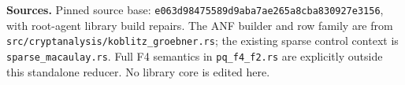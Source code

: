 \documentclass[10pt]{article}
\begin{document}
\textbf{Sources.} Pinned source base:
\texttt{e063d98475589d9aba7ae265a8cba830927e3156}, with root-agent library
build repairs. The ANF builder and row family are from
\texttt{src/cryptanalysis/koblitz\_groebner.rs}; the existing sparse control context
is \texttt{sparse\_macaulay.rs}. Full F4 semantics in \texttt{pq\_f4\_f2.rs} are
explicitly outside this standalone reducer. No library core is edited here.
\end{document}
